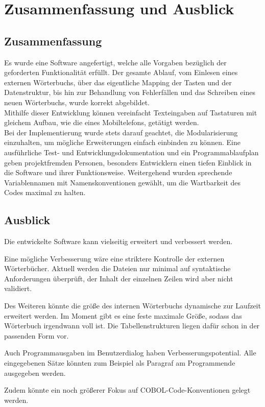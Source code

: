 \chapter{Zusammenfassung und Ausblick}\label{ch:zusammenfassung-und-ausblick}


\section{Zusammenfassung}\label{sec:zusammenfassung}
Es wurde eine Software angefertigt, welche alle Vorgaben bezüglich der geforderten Funktionalität erfüllt.
Der gesamte Ablauf, vom Einlesen eines externen Wörterbuchs, über das eigentliche Mapping der Tasten und der Datenstruktur, bis hin zur Behandlung von Fehlerfällen und das Schreiben eines neuen Wörterbuchs, wurde korrekt abgebildet.\\

Mithilfe dieser Entwicklung können vereinfacht Texteingaben auf Tastaturen mit gleichem Aufbau, wie die eines Mobiltelefons, getätigt werden.\\
Bei der Implementierung wurde stets darauf geachtet, die Modularisierung einzuhalten, um mögliche Erweiterungen einfach einbinden zu können.
Eine ausführliche Test- und Entwicklungsdokumentation und ein Programmablaufplan geben projektfremden Personen, besonders Entwicklern einen tiefen Einblick in die Software und ihrer Funktionsweise.
Weitergehend wurden sprechende Variablennamen mit Namenskonventionen gewählt, um die Wartbarkeit des Codes maximal zu halten.


\section{Ausblick}\label{sec:ausblick}
Die entwickelte Software kann vielseitig erweitert und verbessert werden.

Eine mögliche Verbesserung wäre eine striktere Kontrolle der externen Wörterbücher.
Aktuell werden die Dateien nur minimal auf syntaktische Anforderungen überprüft, der Inhalt der einzelnen Zeilen wird aber nicht validiert.

Des Weiteren könnte die größe des internen Wörterbuchs dynamische zur Laufzeit erweitert werden.
Im Moment gibt es eine feste maximale Größe, sodass das Wörterbuch irgendwann voll ist.
Die Tabellenstrukturen liegen dafür schon in der passenden Form vor.

Auch Programmausgaben im Benutzerdialog haben Verbesserungspotential.
Alle eingegebenen Sätze könnten zum Beispiel als Paragraf am Programmende ausgegeben werden.

Zudem könnte ein noch größerer Fokus auf COBOL-Code-Konventionen gelegt werden.
